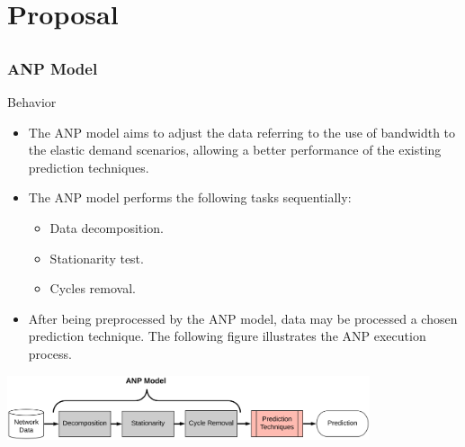 \documentclass[aspectratio=169]{beamer}
\begin{document}

\section{Proposal}


\subsection{}
\begin{frame}
\frametitle{ANP Model}
\begin{block}{Behavior}
    \begin{itemize}\small
    \item The ANP model aims to adjust the data referring to the use of bandwidth to the elastic demand scenarios, allowing a better performance of the existing prediction techniques.
    \item The ANP model performs the following tasks sequentially:
    \begin{itemize}[triangle]
        \item Data decomposition.
        \item Stationarity test. 
        \item Cycles removal.
    \end{itemize}
    \item After being preprocessed by the ANP model, data may be processed a chosen prediction technique. The following figure illustrates the ANP execution process.
    \end{itemize}
\end{block}

\centering
\includegraphics[width=0.8\textwidth,angle=0]{ANPModel.png}

\end{frame}
\end{document}
